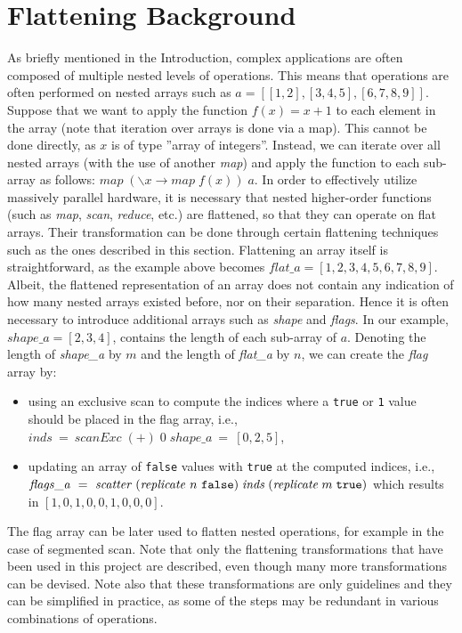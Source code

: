 \newpage
\section{Flattening Background}
\label{chapter:section:flattening}
As briefly mentioned in the Introduction, complex applications are often composed of multiple nested levels of operations. This means that operations are often performed on nested arrays such as $a=[[1,2],[3,4,5],[6,7,8,9]]$. Suppose that we want to apply the function $f(x)=x+1$ to each element in the array (note that iteration over arrays is done via a map). This cannot be done directly, as $x$ is of type ''array of integers''. Instead, we can iterate over all nested arrays (with the use of another \textit{map}) and apply the function to each sub-array as follows: $\mathit{map}\;(\backslash x\rightarrow \mathit{map}\;f(x))\;a$. In order to effectively utilize massively parallel hardware, it is necessary that nested higher-order functions (such as \textit{map}, \textit{scan}, \textit{reduce}, etc.) are flattened, so that they can operate on flat arrays. Their
transformation can be done through certain flattening techniques such as the ones described in this section. Flattening an array itself is straightforward, as the example above becomes $\mathit{flat\_a}=[1,2,3,4,5,6,7,8,9]$. Albeit, the flattened representation of an array does not contain any indication of how many nested arrays existed before, nor on their separation. Hence it is often necessary to introduce additional arrays such as \textit{shape} and \textit{flags}. In our example, $\mathit{shape\_a}=[2,3,4]$, contains the length of each sub-array of $a$. Denoting the length of \textit{shape\_a} by $m$ and the length of \textit{flat\_a} by $n$, we can create the \textit{flag} array by:

\begin{itemize}
    \item using an exclusive scan to compute the indices where a {\tt true} or {\tt 1} value should be placed in the flag array, i.e., $\mathit{inds}~=~\mathit{scanExc}\;(+)\;0\;\mathit{shape\_a}~=~[0,2,5]$,
    \item updating an array of {\tt false} values with {\tt true} at the computed indices, i.e., $\mathit{flags\_a}~=~\mathit{scatter}\;(\mathit{replicate}~n~\mbox{\tt false})\;\mathit{inds}\;(\mathit{replicate}\;m\;\mbox{\tt{}true})$ which results in $[1,0,1,0,0,1,0,0,0]$.
\end{itemize}

The flag array can be later used to flatten nested operations, for example in the case of segmented scan. Note that only the flattening transformations that have been used in this project are described, even though many more transformations can be devised. Note also that these transformations are only guidelines and they can be simplified in practice, as some of the steps may be redundant in various combinations of operations. 

